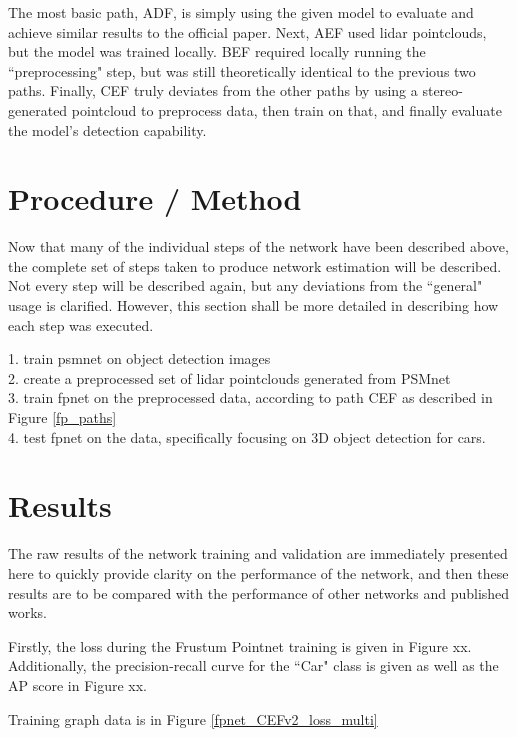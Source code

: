 The most basic path, ADF, is simply using the given model to evaluate and achieve similar results to the official paper. Next, AEF used lidar pointclouds, but the model was trained locally. BEF required locally running the ``preprocessing" step, but was still theoretically identical to the previous two paths. Finally, CEF truly deviates from the other paths by using a stereo-generated pointcloud to preprocess data, then train on that, and finally evaluate the model's detection capability. 


\newpage
\section{Procedure / Method}
Now that many of the individual steps of the network have been described above, the complete set of steps taken to produce network estimation will be described. Not every step will be described again, but any deviations from the ``general" usage is clarified. However, this section shall be more detailed in describing how each step was executed.

1. train psmnet on object detection images\\
2. create a preprocessed set of lidar pointclouds generated from PSMnet \\
3. train fpnet on the preprocessed data, according to path CEF as described in Figure \ref{fp_paths} \\
4. test fpnet on the data, specifically focusing on 3D object detection for cars. \\


\newpage
\section{Results}
The raw results of the network training and validation are immediately presented here to quickly provide clarity on the performance of the network, and then these results are to be compared with the performance of other networks and published works. 

Firstly, the loss during the Frustum Pointnet training is given in Figure xx. Additionally, the precision-recall curve for the ``Car" class is given as well as the AP score in Figure xx. 
 
Training graph data is in Figure \ref{fpnet_CEFv2_loss_multi}
 
